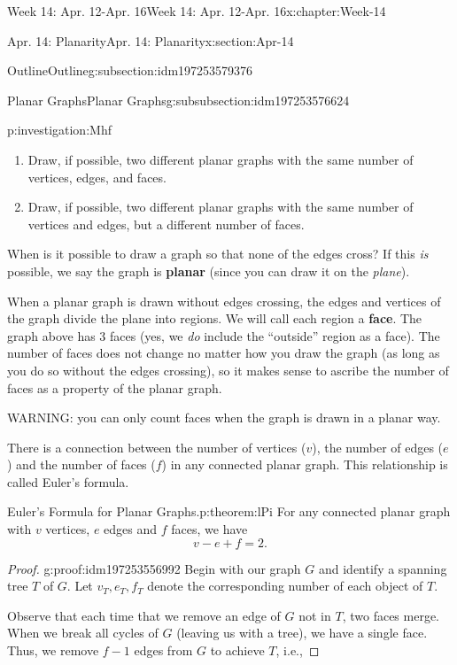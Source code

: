 \documentclass[oneside,10pt,]{book}
\newcommand{\terminology}[1]{\textbf{#1}}
\numberwithin{equation}{section}
\begin{document}
\begin{chapterptx}{Week 14: Apr. 12-Apr. 16}{}{Week 14: Apr. 12-Apr. 16}{}{}{x:chapter:Week-14}
\begin{sectionptx}{Apr. 14: Planarity}{}{Apr. 14: Planarity}{}{}{x:section:Apr-14}
\begin{subsectionptx}{Outline}{}{Outline}{}{}{g:subsection:idm197253579376}
\begin{subsubsectionptx}{Planar Graphs}{}{Planar Graphs}{}{}{g:subsubsection:idm197253576624}
\begin{investigation}{}{p:investigation:Mhf}
\begin{enumerate}
\item{}Draw, if possible, two different planar graphs with the same number of vertices, edges, and faces.%
\item{}Draw, if possible, two different planar graphs with the same number of vertices and edges, but a different number of faces.%
\end{enumerate}
%
\end{investigation}%
 When is it possible to draw a graph so that none of the edges cross? If this \emph{is} possible, we say the graph is \terminology{planar} (since you can draw it on the \emph{plane}).%
\par
{} When a planar graph is drawn without edges crossing, the edges and vertices of the graph divide the plane into regions. We will call each region a \terminology{face}. The graph above has 3 faces (yes, we \emph{do} include the ``outside'' region as a face). The number of faces does not change no matter how you draw the graph (as long as you do so without the edges crossing), so it makes sense to ascribe the number of faces as a property of the planar graph.%
\par
WARNING: you can only count faces when the graph is drawn in a planar way.%
\par
There is a connection between the number of vertices (\(v\)), the number of edges (\(e\)) and the number of faces (\(f\)) in any connected planar graph. This relationship is called Euler's formula.%
\begin{theorem}{Euler's Formula for Planar Graphs.}{}{p:theorem:lPi}%
%
For any connected planar graph with \(v\) vertices, \(e\) edges and \(f\) faces, we have%
\begin{equation*}
v-e + f = 2\text{.}
\end{equation*}
%
\end{theorem}
\begin{proof}{}{g:proof:idm197253556992}
Begin with our graph \(G\) and identify a spanning tree \(T\) of \(G\). Let \(v_T, e_T,  f_T\) denote the corresponding number of each object of \(T\).%
\par
Observe that each time that we remove an edge of \(G\) not in \(T\), two faces merge. When we break all cycles of \(G\) (leaving us with a tree), we have a single face. Thus, we remove \(f-1\) edges from \(G\) to achieve \(T\), i.e.,%

\end{proof}
\end{subsubsectionptx}
\end{subsectionptx}
\end{sectionptx}
\end{chapterptx}
\end{document}
